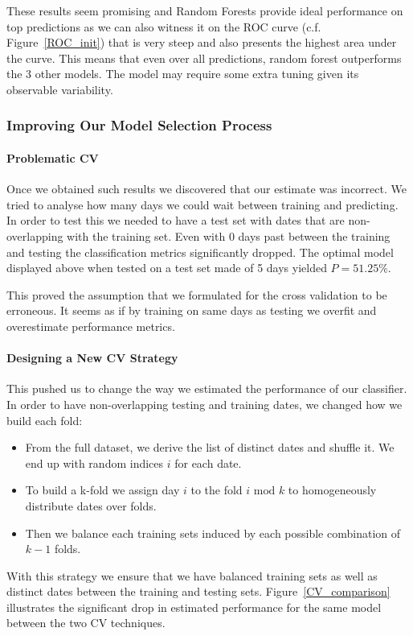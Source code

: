 \vspace{\baselineskip}
These results seem promising and Random Forests provide ideal performance on top predictions as we can also witness it on the ROC curve (c.f. Figure~\ref{ROC_init}) that is very steep and also presents the highest area under the curve. This means that even over all predictions, random forest outperforms the 3 other models. The model may require some extra tuning given its observable variability. 

\subsubsection{Improving Our Model Selection Process}
\paragraph{Problematic CV} Once we obtained such results we discovered that our estimate was incorrect. We tried to analyse how many days we could wait between training and predicting. In order to test this we needed to have a test set with dates that are non-overlapping with the training set. Even with 0 days past between the training and testing the classification metrics significantly dropped. The optimal model displayed above when tested on a test set made of 5 days yielded $P=51.25\%$. 

This proved the assumption that we formulated for the cross validation to be erroneous. It seems as if by training on same days as testing we overfit and overestimate performance metrics.	

\paragraph{Designing a New CV Strategy}
This pushed us to change the way we estimated the performance of our classifier. In order to have non-overlapping testing and training dates, we changed how we build each fold:
\begin{itemize}[noitemsep]
	\item From the full dataset, we derive the list of distinct dates and shuffle it. We end up with random indices $i$ for each date.
	\item To build a k-fold we assign day $i$ to the fold $i \text{ mod } k$ to homogeneously distribute dates over folds.
	\item Then we balance each training sets induced by each possible combination of $k-1$ folds.
\end{itemize}
With this strategy we ensure that we have balanced training sets as well as distinct dates between the training and testing sets. Figure~\ref{CV_comparison} illustrates the significant drop in estimated performance for the same model between the two CV techniques. 

